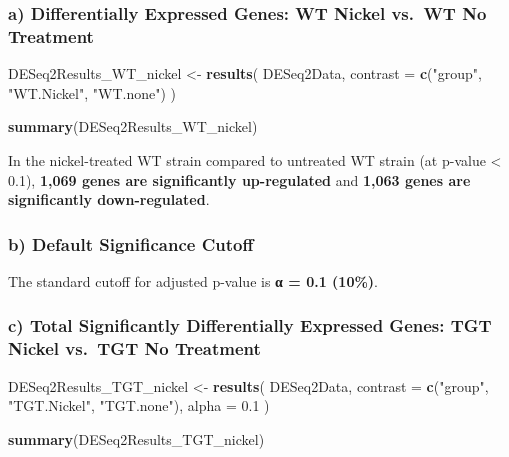 \documentclass[
  11pt,
]{article}
\newenvironment{Shaded}{\begin{snugshade}}{\end{snugshade}}
\newcommand{\AttributeTok}[1]{\textcolor[rgb]{0.13,0.29,0.53}{#1}}
\newcommand{\FloatTok}[1]{\textcolor[rgb]{0.00,0.00,0.81}{#1}}
\newcommand{\FunctionTok}[1]{\textcolor[rgb]{0.13,0.29,0.53}{\textbf{#1}}}
\newcommand{\NormalTok}[1]{#1}
\newcommand{\OtherTok}[1]{\textcolor[rgb]{0.56,0.35,0.01}{#1}}
\newcommand{\StringTok}[1]{\textcolor[rgb]{0.31,0.60,0.02}{#1}}
\begin{document}
\subsubsection{a) Differentially Expressed Genes: WT Nickel vs.~WT No
Treatment}\label{a-differentially-expressed-genes-wt-nickel-vs.-wt-no-treatment}

\begin{Shaded}
\begin{Highlighting}[]
\NormalTok{DESeq2Results\_WT\_nickel }\OtherTok{\textless{}{-}} \FunctionTok{results}\NormalTok{(}
\NormalTok{  DESeq2Data, }
  \AttributeTok{contrast =} \FunctionTok{c}\NormalTok{(}\StringTok{"group"}\NormalTok{, }\StringTok{"WT.Nickel"}\NormalTok{, }\StringTok{"WT.none"}\NormalTok{)}
\NormalTok{)}

\FunctionTok{summary}\NormalTok{(DESeq2Results\_WT\_nickel)}
\end{Highlighting}
\end{Shaded}

In the nickel-treated WT strain compared to untreated WT strain (at
p-value \textless{} 0.1), \textbf{1,069 genes are significantly
up-regulated} and \textbf{1,063 genes are significantly down-regulated}.

\subsubsection{b) Default Significance
Cutoff}\label{b-default-significance-cutoff}

The standard cutoff for adjusted p-value is \textbf{α = 0.1 (10\%)}.

\subsubsection{c) Total Significantly Differentially Expressed Genes:
TGT Nickel vs.~TGT No
Treatment}\label{c-total-significantly-differentially-expressed-genes-tgt-nickel-vs.-tgt-no-treatment}

\begin{Shaded}
\begin{Highlighting}[]
\NormalTok{DESeq2Results\_TGT\_nickel }\OtherTok{\textless{}{-}} \FunctionTok{results}\NormalTok{(}
\NormalTok{  DESeq2Data, }
  \AttributeTok{contrast =} \FunctionTok{c}\NormalTok{(}\StringTok{"group"}\NormalTok{, }\StringTok{"TGT.Nickel"}\NormalTok{, }\StringTok{"TGT.none"}\NormalTok{),}
  \AttributeTok{alpha =} \FloatTok{0.1}
\NormalTok{)}

\FunctionTok{summary}\NormalTok{(DESeq2Results\_TGT\_nickel)}
\end{Highlighting}
\end{Shaded}
\end{document}
